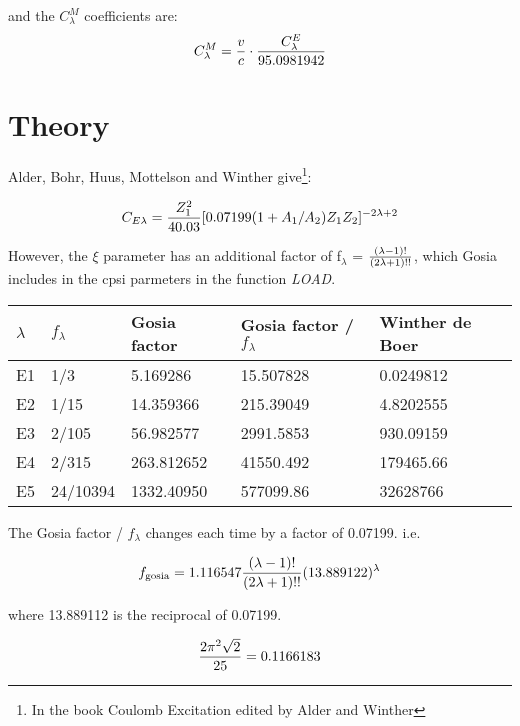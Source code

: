 and the $C_\lambda^{M}$ coefficients are:\\

\begin{equation}
C_\lambda^M = {v \over c} \cdot {C_\lambda^E \over 95.0981942}
\end{equation}

\section{Theory}

Alder, Bohr, Huus, Mottelson and Winther give\footnote{In the book Coulomb
Excitation edited by Alder and Winther}:

\begin{equation}
C_{E\lambda} = { Z_1^2 \over 40.03} [0.07199(1+A_1/A_2) Z_1 Z_2]^{-2\lambda+2}
\end{equation}

However, the $\xi$ parameter has an additional factor of f$_\lambda$ = ${(\lambda - 1)!
\over (2 \lambda + 1)!!}$, which Gosia includes in the cpsi parmeters in the
function {\em LOAD}.\\

\begin{tabular}{l|l|l|l|l}
\hline
$\lambda$ & $f_\lambda$ & Gosia factor & Gosia
factor /  $f_\lambda$ & Winther de Boer\\
\hline
E1 & 1/3   & 5.169286   & 15.507828 & 0.0249812\\
E2 & 1/15  & 14.359366  & 215.39049 & 4.8202555\\
E3 & 2/105 & 56.982577  & 2991.5853 & 930.09159\\
E4 & 2/315 & 263.812652 & 41550.492 & 179465.66\\
E5 & 24/10394 & 1332.40950 & 577099.86 & 32628766\\
\end{tabular}

The Gosia factor / $f_\lambda$ changes each time by a factor of 0.07199. i.e.

\begin{equation}
f_{\mathrm{gosia}} = 1.116547
{(\lambda - 1)! \over (2 \lambda + 1)!!}
(13.889122)^{\lambda}
\end{equation}

where 13.889112 is the reciprocal of 0.07199.

\begin{equation}
{2 \pi^2 \sqrt{2} \over 25} = 0.1166183
\end{equation}

